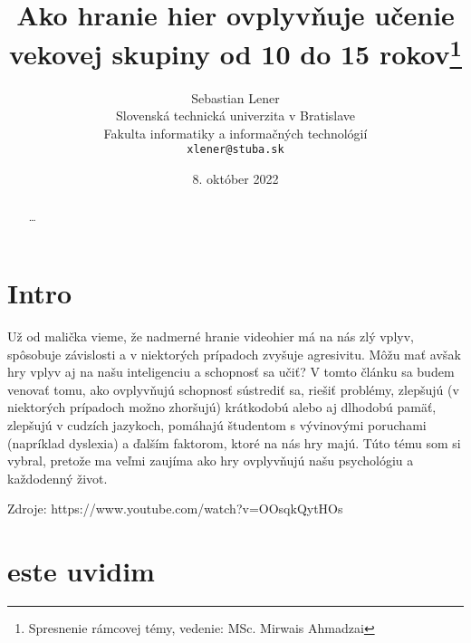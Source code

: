 \documentclass[10pt,twoside,slovak,a4paper]{article}
\title{Ako hranie hier ovplyvňuje učenie vekovej skupiny od 10 do 15 rokov\thanks{Spresnenie rámcovej témy, vedenie: MSc. Mirwais Ahmadzai}}
\author{Sebastian Lener\\[2pt]
{\small Slovenská technická univerzita v Bratislave}\\
{\small Fakulta informatiky a informačných technológií}\\
{\small \texttt{xlener@stuba.sk}}
}
\date{\small 8. október 2022}
\begin{document}
\maketitle
\begin{abstract}
\ldots
\end{abstract}



\section{Intro}
Už od malička vieme, že nadmerné hranie videohier má na nás zlý vplyv, spôsobuje závislosti a v niektorých prípadoch zvyšuje agresivitu. Môžu mať avšak hry vplyv aj na našu inteligenciu a schopnosť sa učiť? V tomto článku sa budem venovať tomu, ako ovplyvňujú schopnosť sústrediť sa, riešiť problémy, zlepšujú (v niektorých prípadoch možno zhoršujú) krátkodobú alebo aj dlhodobú pamäť, zlepšujú v cudzích jazykoch, pomáhajú študentom s vývinovými poruchami (napríklad dyslexia) a ďalším faktorom, ktoré na nás hry majú. Túto tému som si vybral, pretože ma veľmi zaujíma ako hry ovplyvňujú našu psychológiu a každodenný život. 

Zdroje: https://www.youtube.com/watch?v=OOsqkQytHOs
\section{este uvidim}




\end{document}
